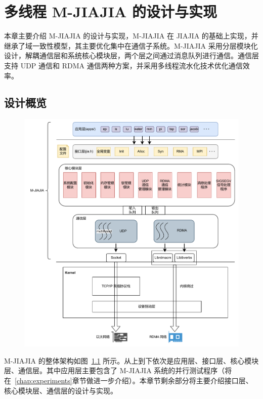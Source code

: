 \chapter{多线程 M-JIAJIA 的设计与实现}\label{chap:MJIAJIA}{
    本章主要介绍 M-JIAJIA 的设计与实现，M-JIAJIA 在 JIAJIA 的基础上实现，并继承了域一致性模型，其主要优化集中在通信子系统。M-JIAJIA 采用分层模块化设计，解耦通信层和系统核心模块层，两个层之间通过消息队列进行通信。通信层支持 UDP 通信和 RDMA 通信两种方案，并采用多线程流水化技术优化通信效率。

    \section{设计概览}\label{sec:设计概览}
    \begin{figure}[!htbp]
        \centering
        \includegraphics[width=1.0\textwidth]{Img/MJIAJIA系统框架图.drawio.pdf}
        \label{fig:system-arch}
    \end{figure}
    M-JIAJIA 的整体架构如图~\ref{fig:system-arch} 所示。从上到下依次是应用层、接口层、核心模块层、通信层。其中应用层主要包含了 M-JIAJIA 系统的并行测试程序（将在~\ref{chap:experiments}章节做进一步介绍）。本章节剩余部分将主要介绍接口层、核心模块层、通信层的设计与实现。

}
